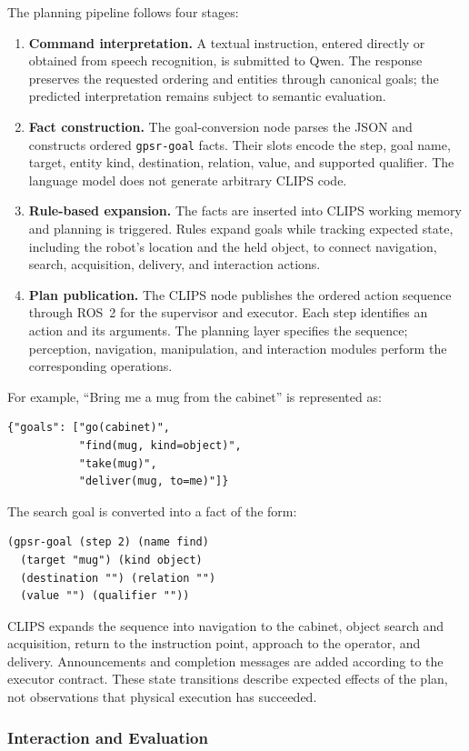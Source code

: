The planning pipeline follows four stages:
\begin{enumerate}[leftmargin=*]
    \item \textbf{Command interpretation.} A textual instruction, entered directly or obtained from speech recognition, is submitted to Qwen. The response preserves the requested ordering and entities through canonical goals; the predicted interpretation remains subject to semantic evaluation.
    \item \textbf{Fact construction.} The goal-conversion node parses the JSON and constructs ordered \texttt{gpsr-goal} facts. Their slots encode the step, goal name, target, entity kind, destination, relation, value, and supported qualifier. The language model does not generate arbitrary CLIPS code.
    \item \textbf{Rule-based expansion.} The facts are inserted into CLIPS working memory and planning is triggered. Rules expand goals while tracking expected state, including the robot's location and the held object, to connect navigation, search, acquisition, delivery, and interaction actions.
    \item \textbf{Plan publication.} The CLIPS node publishes the ordered action sequence through ROS~2 for the supervisor and executor. Each step identifies an action and its arguments. The planning layer specifies the sequence; perception, navigation, manipulation, and interaction modules perform the corresponding operations.
\end{enumerate}

For example, ``Bring me a mug from the cabinet'' is represented as:
\begin{verbatim}
{"goals": ["go(cabinet)",
           "find(mug, kind=object)",
           "take(mug)",
           "deliver(mug, to=me)"]}
\end{verbatim}
The search goal is converted into a fact of the form:
\begin{verbatim}
(gpsr-goal (step 2) (name find)
  (target "mug") (kind object)
  (destination "") (relation "")
  (value "") (qualifier ""))
\end{verbatim}
CLIPS expands the sequence into navigation to the cabinet, object search and acquisition, return to the instruction point, approach to the operator, and delivery. Announcements and completion messages are added according to the executor contract. These state transitions describe expected effects of the plan, not observations that physical execution has succeeded.

\subsubsection{Interaction and Evaluation}

